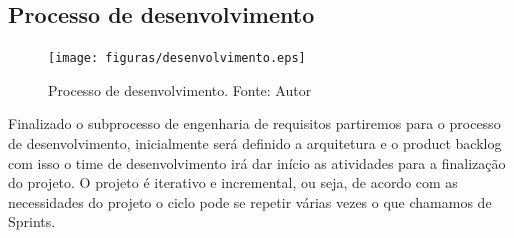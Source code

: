 \subsection{Processo de desenvolvimento}

\begin{figure}[ht]
	\centering
    \texttt{[image: figuras/desenvolvimento.eps]}
    \caption[Processo de desenvolvimento.]{Processo de desenvolvimento. Fonte: Autor}
	\label{fig:desenvolvimento}
\end{figure}

Finalizado o subprocesso de engenharia de requisitos partiremos para o processo de desenvolvimento, inicialmente será definido a arquitetura e o product backlog com isso o time de desenvolvimento irá dar início as atividades para a finalização do projeto. O projeto é iterativo e incremental, ou seja, de acordo com as necessidades do projeto o ciclo pode se repetir várias vezes o que chamamos de Sprints.